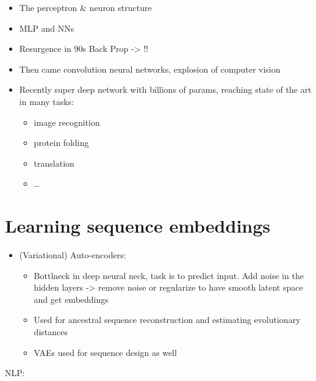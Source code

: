 \documentclass[
  11pt,
  twoside,
  BCOR=10mm,
  listof=totoc]{scrbook}
\providecommand{\tightlist}{%
  \setlength{\itemsep}{0pt}\setlength{\parskip}{0pt}}
\begin{document}
\begin{itemize}
\item
  The perceptron \autocite{rosenblattPerceptronProbabilisticModel1958} \& neuron structure
\item
  MLP and NNs
\item
  Resurgence in 90s Back Prop -\textgreater{} !!
\item
  Then came convolution neural networks, explosion of computer vision
\item
  Recently super deep network with billions of params, reaching state of the art in many tasks:

  \begin{itemize}
  \item
    image recognition
  \item
    protein folding
  \item
    translation
  \item
    \ldots{}
  \end{itemize}
\end{itemize}

\hypertarget{learning-sequence-embeddings}{%
\section{Learning sequence embeddings}\label{learning-sequence-embeddings}}

\begin{itemize}
\item
  (Variational) Auto-encoders:

  \begin{itemize}
  \tightlist
  \item
    Bottlneck in deep neural neck, task is to predict input. Add noise in the hidden layers -\textgreater{} remove noise or regularize to have smooth latent space and get embeddings
  \item
    Used for ancestral sequence reconstruction \autocite{moretaAncestralProteinSequence2022} and estimating evolutionary distances \autocite{corsoNeuralDistanceEmbeddings2021}
  \item
    VAEs used for sequence design as well \autocite{wuProteinSequenceDesign2021,stantonAcceleratingBayesianOptimization2022}
  \end{itemize}
\end{itemize}

NLP:
\end{document}
